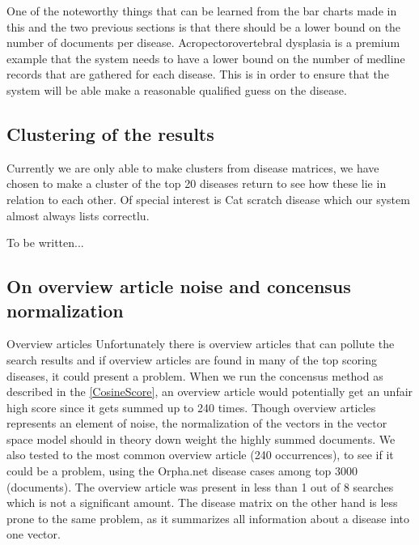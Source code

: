 One of the noteworthy things that can be learned from the bar charts made in this and the two previous sections is that there should be a lower bound on the number of documents per disease. Acropectorovertebral dysplasia is a premium example that the system needs to have a lower bound on the number of medline records that are gathered for each disease. This is in order to ensure that the system will be able make a reasonable qualified guess on the disease.

\subsection{Clustering of the results}
Currently we are only able to make clusters from disease matrices, we have chosen to make a cluster of the top 20 diseases return to see how these lie in relation to each other. Of special interest is Cat scratch disease which our system almost always lists correctlu. %




To be written...




\subsection{On overview article noise and concensus normalization\label{Overview}}

Overview articles
Unfortunately there is overview articles that can pollute the search results and if overview articles are found in many of the top scoring diseases, it could present a problem. When we run the concensus method as described in the \ref{CosineScore}, an overview article would potentially get an unfair high score since it gets summed up to 240 times. Though overview articles represents an element of noise, the normalization of the vectors in the vector space model should in theory down weight the highly summed documents. We also tested to the most common overview article (240 occurrences), to see if it could be a problem, using the Orpha.net disease cases among top 3000 (documents). The overview article was present in less than 1 out of 8 searches which is not a significant amount. The disease matrix on the other hand is less prone to the same problem, as it summarizes all information about a disease into one vector. 


